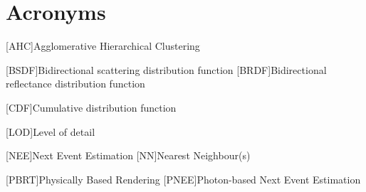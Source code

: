 \newpage
\section*{Acronyms}

\begin{acronym}[ECU]


[AHC]{Agglomerative Hierarchical Clustering}


[BSDF]{Bidirectional scattering distribution function}
[BRDF]{Bidirectional reflectance distribution function}

[CDF]{Cumulative distribution function}

[LOD]{Level of detail}

[NEE]{Next Event Estimation}
[NN]{Nearest Neighbour(s)}

[PBRT]{Physically Based Rendering}
[PNEE]{Photon-based Next Event Estimation}


\end{acronym}
